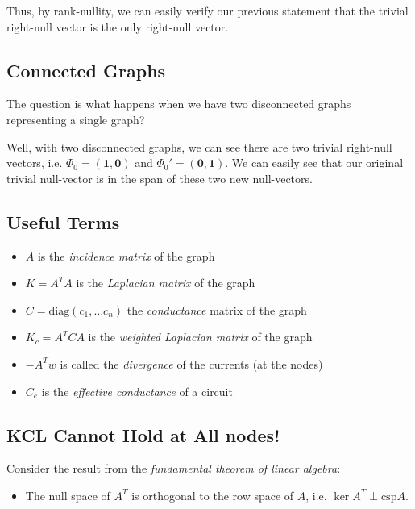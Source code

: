 \documentclass[]{article}
\providecommand{\tightlist}{%
  \setlength{\itemsep}{0pt}\setlength{\parskip}{0pt}}
\begin{document}
Thus, by rank-nullity, we can easily verify our previous statement that
the trivial right-null vector is the only right-null vector.

\subsection{Connected Graphs}\label{connected-graphs}

The question is what happens when we have two disconnected graphs
representing a single graph?

Well, with two disconnected graphs, we can see there are two trivial
right-null vectors, i.e.
\(\Phi_0 = \left(\mathbf{1}, \mathbf{0} \right)\) and
\(\Phi_0' = \left(\mathbf{0}, \mathbf{1} \right)\). We can easily see
that our original trivial null-vector is in the span of these two new
null-vectors.

\subsection{Useful Terms}\label{useful-terms}

\begin{itemize}
\item
  \(A\) is the \emph{incidence matrix} of the graph
\item
  \(K = A^T A\) is the \emph{Laplacian matrix} of the graph
\item
  \(C = \text{diag}(c_1, \dots c_n)\) the \emph{conductance} matrix of
  the graph
\item
  \(K_c = A^T C A\) is the \emph{weighted Laplacian matrix} of the graph
\item
  \(-A^Tw\) is called the \emph{divergence} of the currents (at the
  nodes)
\item
  \(C_{e}\) is the \emph{effective conductance} of a circuit
\end{itemize}

\subsection{KCL Cannot Hold at All
nodes!}\label{kcl-cannot-hold-at-all-nodes}

Consider the result from the \emph{fundamental theorem of linear
algebra}:

\begin{itemize}
\tightlist
\item
  The null space of \(A^T\) is orthogonal to the row space of \(A\),
  i.e. \(\ker A^T \perp \text{csp} A\).
\end{itemize}
\end{document}
